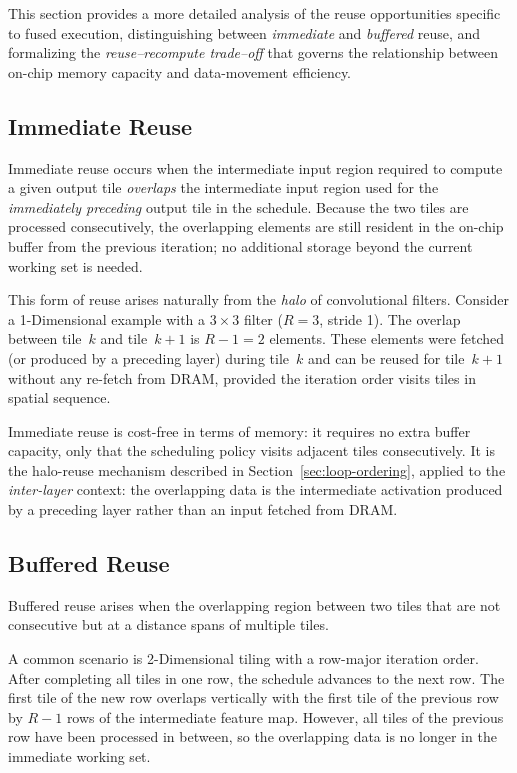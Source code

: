 This section provides a more detailed analysis of the reuse
opportunities specific to fused execution, distinguishing between
\emph{immediate} and \emph{buffered} reuse, and formalizing the
\emph{reuse--recompute trade--off} that governs the relationship
between on-chip memory capacity and data-movement efficiency.

\subsection{Immediate Reuse}
\label{sec:fds-immediate-reuse}

Immediate reuse occurs when the intermediate input region required
to compute a given output tile \emph{overlaps} the intermediate input
region used for the \emph{immediately preceding} output tile in the
schedule.
Because the two tiles are processed consecutively, the overlapping
elements are still resident in the on-chip buffer from the previous
iteration; no additional storage beyond the current working set is
needed.


This form of reuse arises naturally from the \emph{halo} of
convolutional filters.
Consider a 1-Dimensional example with a $3\times 3$ filter ($R = 3$, stride 1).
The overlap between tile~$k$ and tile~$k+1$ is $R - 1 = 2$ elements.
These elements were fetched (or produced by a preceding layer)
during tile~$k$ and can be reused for tile~$k+1$ without any
re-fetch from DRAM, provided the iteration order visits tiles in spatial
sequence.

Immediate reuse is cost-free in terms of memory: it requires no
extra buffer capacity, only that the scheduling policy visits
adjacent tiles consecutively.
It is the halo-reuse mechanism described in
Section~\ref{sec:loop-ordering}, applied to the \emph{inter-layer}
context: the overlapping data is the intermediate activation produced
by a preceding layer rather than an input fetched from DRAM.


\subsection{Buffered Reuse}
\label{sec:fds-buffered-reuse}

Buffered reuse arises when the overlapping region between two tiles that are not consecutive but at
a distance spans of multiple tiles.

A common scenario is 2-Dimensional tiling with a row-major iteration order.
After completing all tiles in one row, the schedule advances to the
next row.
The first tile of the new row overlaps vertically with the first tile
of the previous row by $R - 1$ rows of the intermediate feature map.
However, all tiles of the previous row have been processed in between,
so the overlapping data is no longer in the immediate working set.

